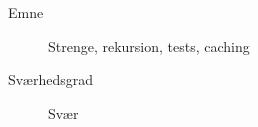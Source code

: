 \begin{description}
\item[Emne] Strenge, rekursion, tests, caching
\item[Sværhedsgrad] Svær
\end{description}
